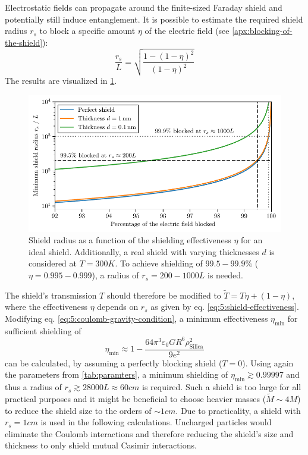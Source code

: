 Electrostatic fields can propagate around the finite-sized Faraday shield and potentially still induce entanglement.
It is possible to estimate the required shield radius $r_s$ to block a specific amount $\eta$ of the electric field (see \cref{apx:blocking-of-the-shield}):
\begin{equation}\label{eq:5:shield-effectiveness}
  \frac{r_s}{L} = \sqrt{\frac{1-(1-\eta)^2}{(1-\eta)^2}}
\end{equation}
The results are visualized in \cref{fig:5:shield-radius}.
\begin{figure}[!ht]
  \centering
  \includegraphics[width=\textwidth]{./../figures/others/shield-radius.pdf}
  \caption{Shield radius as a function of the shielding effectiveness $\eta$ for an ideal shield. Additionally, a real shield with varying thicknesses $d$ is considered at $T=300\si{K}$.
  To achieve shielding of $99.5-99.9\%$ ($\eta = 0.995-0.999$), a radius of $r_s =200-1000L$ is needed.}
  \label{fig:5:shield-radius}
\end{figure}
The shield's transmission $T$ should therefore be modified to $\tilde{T} = T\eta + (1-\eta)$, where the effectiveness $\eta$ depends on $r_s$ as given by eq. \eqref{eq:5:shield-effectiveness}.
Modifying eq. \eqref{eq:5:coulomb-gravity-condition}, a minimum effectiveness $\eta_\mathrm{min}$ for sufficient shielding of
\begin{equation}
  \eta_\mathrm{min} \approx 1 - \frac{64\pi^3 \varepsilon_0 G R^6 \rho^2_\mathrm{Silica}}{9 e^2}
\end{equation}
can be calculated, by assuming a perfectly blocking shield ($T=0$).
Using again the parameters from \cref{tab:paramters}, a minimum shielding of $\eta_\mathrm{min} \gtrsim 0.99997$ and thus a radius of $r_s \gtrsim 28000 L \approx 60\si{cm}$ is required.
Such a shield is too large for all practical purposes and it might be beneficial to choose heavier masses ($\tilde{M} \sim 4 M$) to reduce the shield size to the orders of $\sim 1\si{cm}$.
Due to practicality, a shield with $r_s = 1\si{cm}$ is used in the following calculations.
Uncharged particles would eliminate the Coulomb interactions and therefore reducing the shield's size and thickness to only shield mutual Casimir interactions.




